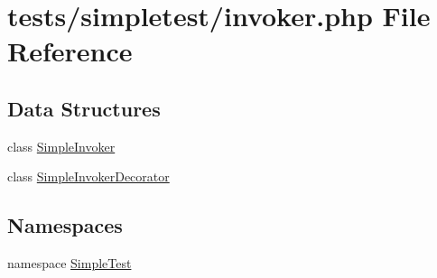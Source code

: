 \hypertarget{invoker_8php}{\section{tests/simpletest/invoker.php File Reference}
\label{invoker_8php}
}
\subsection*{Data Structures}
\begin{DoxyCompactItemize}
\item 
class \hyperlink{class_simple_invoker}{Simple\-Invoker}
\item 
class \hyperlink{class_simple_invoker_decorator}{Simple\-Invoker\-Decorator}
\end{DoxyCompactItemize}
\subsection*{Namespaces}
\begin{DoxyCompactItemize}
\item 
namespace \hyperlink{namespace_simple_test}{Simple\-Test}
\end{DoxyCompactItemize}
